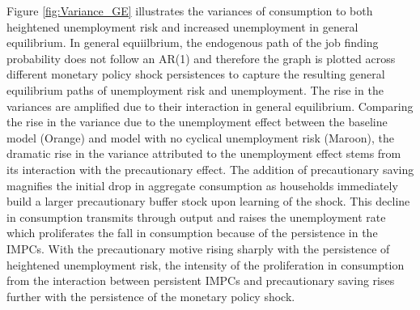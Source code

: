 \documentclass[titlepage]{\econtex}\providecommand{\texname}{Dissertation-Proposal}
\begin{document}
Figure \ref{fig:Variance_GE} illustrates the variances of consumption to both heightened unemployment risk and increased unemployment in general equilibrium. In general equiilbrium, the endogenous path of the job finding probability does not follow an AR(1) and therefore the graph is plotted across different monetary policy shock persistences to capture the resulting general equilibrium paths of unemployment risk and unemployment. The rise in the variances are amplified due to their interaction in general equilibrium. Comparing the rise in the variance due to the unemployment effect between the baseline model (Orange) and model with no cyclical unemployment risk (Maroon), the dramatic rise in the variance attributed to the unemployment effect stems from its interaction with the precautionary effect. The addition of precautionary saving magnifies the initial drop in aggregate consumption as households immediately build a larger precautionary buffer stock upon learning of the shock.  This decline in consumption transmits through output and raises the unemployment rate which proliferates the fall in consumption because of the persistence in the IMPCs. With the precautionary motive rising sharply with the persistence of heightened unemployment risk, the intensity of the proliferation in consumption from the interaction between persistent IMPCs and precautionary saving rises further with the persistence of the monetary policy shock.
\end{document}
